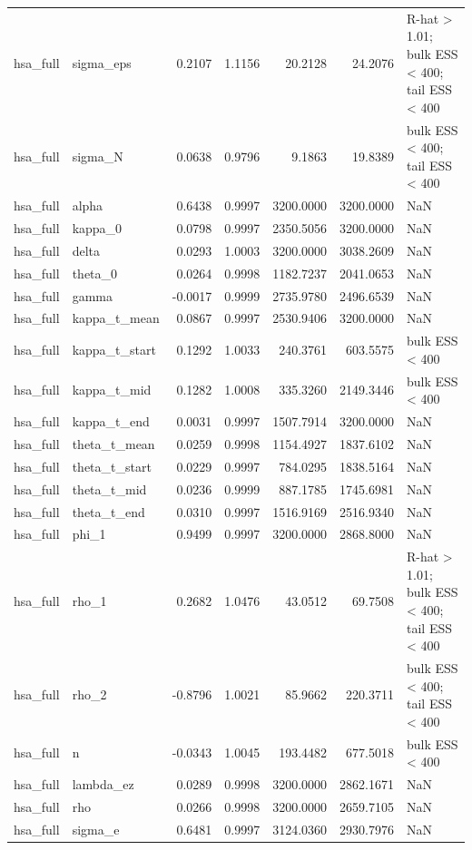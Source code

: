 \begin{tabular}{llrrrrl}
hsa\_full & sigma\_eps & 0.2107 & 1.1156 & 20.2128 & 24.2076 & R-hat > 1.01; bulk ESS < 400; tail ESS < 400 \\
hsa\_full & sigma\_N & 0.0638 & 0.9796 & 9.1863 & 19.8389 & bulk ESS < 400; tail ESS < 400 \\
hsa\_full & alpha & 0.6438 & 0.9997 & 3200.0000 & 3200.0000 & NaN \\
hsa\_full & kappa\_0 & 0.0798 & 0.9997 & 2350.5056 & 3200.0000 & NaN \\
hsa\_full & delta & 0.0293 & 1.0003 & 3200.0000 & 3038.2609 & NaN \\
hsa\_full & theta\_0 & 0.0264 & 0.9998 & 1182.7237 & 2041.0653 & NaN \\
hsa\_full & gamma & -0.0017 & 0.9999 & 2735.9780 & 2496.6539 & NaN \\
hsa\_full & kappa\_t\_mean & 0.0867 & 0.9997 & 2530.9406 & 3200.0000 & NaN \\
hsa\_full & kappa\_t\_start & 0.1292 & 1.0033 & 240.3761 & 603.5575 & bulk ESS < 400 \\
hsa\_full & kappa\_t\_mid & 0.1282 & 1.0008 & 335.3260 & 2149.3446 & bulk ESS < 400 \\
hsa\_full & kappa\_t\_end & 0.0031 & 0.9997 & 1507.7914 & 3200.0000 & NaN \\
hsa\_full & theta\_t\_mean & 0.0259 & 0.9998 & 1154.4927 & 1837.6102 & NaN \\
hsa\_full & theta\_t\_start & 0.0229 & 0.9997 & 784.0295 & 1838.5164 & NaN \\
hsa\_full & theta\_t\_mid & 0.0236 & 0.9999 & 887.1785 & 1745.6981 & NaN \\
hsa\_full & theta\_t\_end & 0.0310 & 0.9997 & 1516.9169 & 2516.9340 & NaN \\
hsa\_full & phi\_1 & 0.9499 & 0.9997 & 3200.0000 & 2868.8000 & NaN \\
hsa\_full & rho\_1 & 0.2682 & 1.0476 & 43.0512 & 69.7508 & R-hat > 1.01; bulk ESS < 400; tail ESS < 400 \\
hsa\_full & rho\_2 & -0.8796 & 1.0021 & 85.9662 & 220.3711 & bulk ESS < 400; tail ESS < 400 \\
hsa\_full & n & -0.0343 & 1.0045 & 193.4482 & 677.5018 & bulk ESS < 400 \\
hsa\_full & lambda\_ez & 0.0289 & 0.9998 & 3200.0000 & 2862.1671 & NaN \\
hsa\_full & rho & 0.0266 & 0.9998 & 3200.0000 & 2659.7105 & NaN \\
hsa\_full & sigma\_e & 0.6481 & 0.9997 & 3124.0360 & 2930.7976 & NaN \\

\end{tabular}
